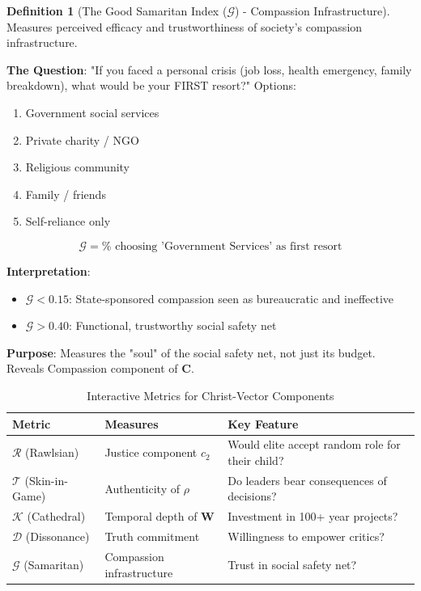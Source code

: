 \documentclass[11pt,a4paper]{article}
\theoremstyle{definition}
\newtheorem{definition}{Definition}[section]
\theoremstyle{remark}
\begin{document}
\begin{definition}[The Good Samaritan Index (\(\mathcal{G}\)) - Compassion Infrastructure]
Measures perceived efficacy and trustworthiness of society's compassion infrastructure.

\textbf{The Question}: "If you faced a personal crisis (job loss, health emergency, family breakdown), what would be your FIRST resort?" Options:
\begin{enumerate}
    \item Government social services
    \item Private charity / NGO
    \item Religious community
    \item Family / friends
    \item Self-reliance only
\end{enumerate}

\begin{equation}
\mathcal{G} = \% \text{ choosing 'Government Services' as first resort}
\end{equation}

\textbf{Interpretation}:
\begin{itemize}
    \item \(\mathcal{G} < 0.15\): State-sponsored compassion seen as bureaucratic and ineffective
    \item \(\mathcal{G} > 0.40\): Functional, trustworthy social safety net
\end{itemize}

\textbf{Purpose}: Measures the "soul" of the social safety net, not just its budget. Reveals Compassion component of \(\mathbf{C}\).
\end{definition}

\begin{table}[H]
\centering
\caption{Interactive Metrics for Christ-Vector Components}
\label{tab:interactive_metrics}
\begin{tabular}{|p{3cm}|p{4cm}|p{6cm}|}
\hline
\textbf{Metric} & \textbf{Measures} & \textbf{Key Feature} \\
\hline
\(\mathcal{R}\) (Rawlsian) & Justice component \(c_2\) & Would elite accept random role for their child? \\
\hline
\(\mathcal{T}\) (Skin-in-Game) & Authenticity of \(\rho\) & Do leaders bear consequences of decisions? \\
\hline
\(\mathcal{K}\) (Cathedral) & Temporal depth of \(\mathbf{W}\) & Investment in 100+ year projects? \\
\hline
\(\mathcal{D}\) (Dissonance) & Truth commitment & Willingness to empower critics? \\
\hline
\(\mathcal{G}\) (Samaritan) & Compassion infrastructure & Trust in social safety net? \\
\hline
\end{tabular}
\end{table}
\end{document}
